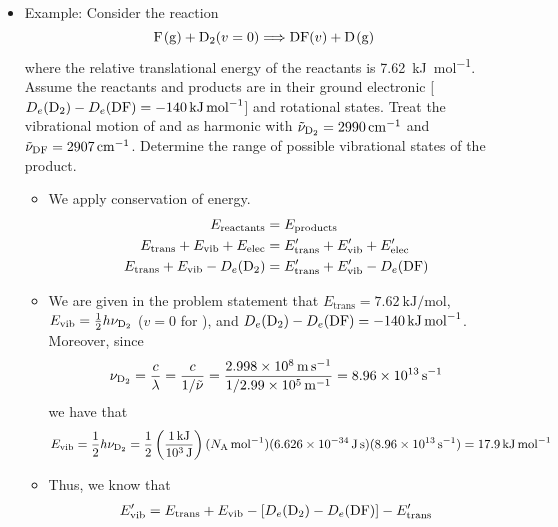 \documentclass[../notes.tex]{subfiles}
\begin{document}
\begin{itemize}
\begin{itemize}
    \end{itemize}
    \item Example: Consider the reaction
    \begin{equation*}
        \ce{F(g) + D2}(v=0) \Longrightarrow \ce{DF($v$) + D(g)}
    \end{equation*}
    where the relative translational energy of the reactants is \SI{7.62}{\kilo\joule\per\mole}. Assume the reactants and products are in their ground electronic [$D_e(\ce{D2})-D_e(\ce{DF})=\SI{-140}{\kilo\joule\per\mole}$] and rotational states. Treat the vibrational motion of  and  as harmonic with $\tilde{\nu}_{\ce{D2}}=\SI{2990}{\per\centi\meter}$ and $\tilde{\nu}_{\ce{DF}}=\SI{2907}{\per\centi\meter}$. Determine the range of possible vibrational states of the product.
    \begin{itemize}
        \item We apply conservation of energy.
        \begin{align*}
            E_\text{reactants} &= E_\text{products}\\
            E_\text{trans}+E_\text{vib}+E_\text{elec} &= E_\text{trans}'+E_\text{vib}'+E_\text{elec}'\\
            E_\text{trans}+E_\text{vib}-D_e(\ce{D2}) &= E_\text{trans}'+E_\text{vib}'-D_e(\ce{DF})
        \end{align*}
        \item We are given in the problem statement that $E_\text{trans}=\SI{7.62}{\kilo\joule\per\mole}$, $E_\text{vib}=\frac{1}{2}h\nu_{\ce{D2}}$ ($v=0$ for ), and $D_e(\ce{D2})-D_e(\ce{DF})=\SI{-140}{\kilo\joule\per\mole}$. Moreover, since
        \begin{equation*}
            \nu_{\ce{D2}} = \frac{c}{\lambda}
            = \frac{c}{1/\tilde{\nu}}
            = \frac{\SI{2.998e8}{\meter\per\second}}{1/\SI{2.99e5}{\per\meter}}
            = \SI{8.96e13}{\per\second}
        \end{equation*}
        we have that
        \begin{equation*}
            E_\text{vib} = \frac{1}{2}h\nu_{\ce{D2}}
            = \frac{1}{2}\left( \frac{\SI{1}{\kilo\joule}}{\SI{e3}{\joule}} \right)(\NA\,\si{\per\mole})(\SI{6.626e-34}{\joule\second})(\SI{8.96e13}{\per\second})
            = \SI{17.9}{\kilo\joule\per\mole}
        \end{equation*}
        \item Thus, we know that
        \begin{align*}
            E_\text{vib}' &= E_\text{trans}+E_\text{vib}-[D_e(\ce{D2})-D_e(\ce{DF})]-E_\text{trans}'\\

\end{align*}
\end{itemize}
\end{itemize}
\end{document}
